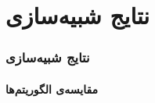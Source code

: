 
\section{نتایج شبیه‌سازی\hfill}

\begin{frame}
\frametitle{نتایج شبیه‌سازی}
\framesubtitle{مقایسه‌ی الگوریتم‌ها}
\end{frame}


